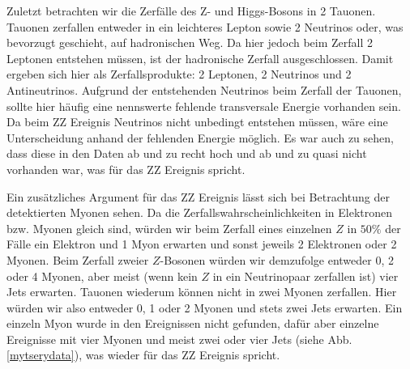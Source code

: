 Zuletzt betrachten wir die Zerfälle des Z- und Higgs-Bosons in 2 Tauonen.
Tauonen zerfallen entweder in ein leichteres Lepton sowie 2 Neutrinos oder, was bevorzugt geschieht, auf hadronischen Weg.
Da hier jedoch beim Zerfall 2 Leptonen entstehen müssen, ist der hadronische Zerfall ausgeschlossen.
Damit ergeben sich hier als Zerfallsprodukte: 2 Leptonen, 2 Neutrinos und 2 Antineutrinos.
Aufgrund der entstehenden Neutrinos beim Zerfall der Tauonen, sollte hier häufig eine nennswerte fehlende transversale Energie vorhanden sein. 
Da beim ZZ Ereignis Neutrinos nicht unbedingt entstehen müssen, wäre eine Unterscheidung anhand der fehlenden Energie möglich.
Es war auch zu sehen, dass diese in den Daten ab und zu recht hoch und ab und zu quasi nicht vorhanden war, was für das ZZ Ereignis spricht.

Ein zusätzliches Argument für das ZZ Ereignis lässt sich bei Betrachtung der detektierten Myonen sehen.
Da die Zerfallswahrscheinlichkeiten in Elektronen bzw. Myonen gleich sind, würden wir beim Zerfall eines einzelnen $Z$ in $50\%$ der Fälle ein Elektron und 1 Myon erwarten und sonst jeweils 2 Elektronen oder 2 Myonen.
Beim Zerfall zweier $Z$-Bosonen würden wir demzufolge entweder 0, 2 oder 4 Myonen, aber meist (wenn kein $Z$ in ein Neutrinopaar zerfallen ist) vier Jets erwarten.
Tauonen wiederum können nicht in zwei Myonen zerfallen.
Hier würden wir also entweder 0, 1 oder 2 Myonen und stets zwei Jets erwarten.
Ein einzeln Myon wurde in den Ereignissen nicht gefunden, dafür aber einzelne Ereignisse mit vier Myonen und meist zwei oder vier Jets (siehe Abb. \ref{mytserydata}), was wieder für das ZZ Ereignis spricht.

